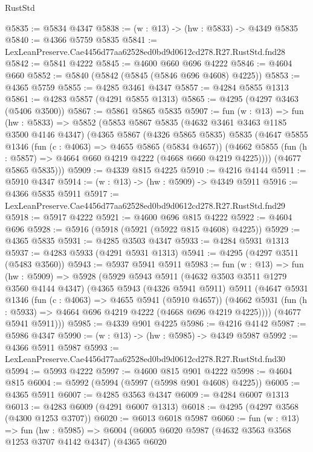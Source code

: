 \begin{lexlean}{RustStd}
\begin{coremodule}
@5835 := @5834 @4347
@5838 := (w : @13) -> (hw : @5833) -> @4349 @5835
@5840 := @4366 @5759 @5835
@5841 := LexLeanPreserve.Cae4456d77aa62528ed0bd9d0612cd278.R27.RustStd.fnd28
@5842 := @5841 @4222
@5845 := @4600 @660 @696 @4222
@5846 := @4604 @660
@5852 := @5840 (@5842 (@5845 (@5846 @696 @4608) @4225))
@5853 := @4365 @5759
@5855 := @4285 @3461 @4347
@5857 := @4284 @5855 @1313
@5861 := @4283 @5857 (@4291 @5855 @1313)
@5865 := @4295 (@4297 @3463 (@5406 @3500))
@5867 := @5861 @5865 @5835
@5907 := fun (w : @13) =>
  fun (hw : @5833) =>
  @5852
    (@5853
      @5867
      @5835
      (@4632 @3461 @3463 @1185 @3500 @4146 @4347)
      (@4365
        @5867
        (@4326 @5865 @5835)
        @5835
        (@4647
          @5855
          @1346
          (fun (c : @4063) => @4655 @5865 (@5834 @4657))
          (@4662 @5855 (fun (h : @5857) => @4664 @660 @4219 @4222 (@4668 @660 @4219 @4225))))
        (@4677 @5865 @5835)))
@5909 := @4339 @815 @4225
@5910 := @4216 @4144
@5911 := @5910 @4347
@5914 := (w : @13) -> (hw : @5909) -> @4349 @5911
@5916 := @4366 @5835 @5911
@5917 := LexLeanPreserve.Cae4456d77aa62528ed0bd9d0612cd278.R27.RustStd.fnd29
@5918 := @5917 @4222
@5921 := @4600 @696 @815 @4222
@5922 := @4604 @696
@5928 := @5916 (@5918 (@5921 (@5922 @815 @4608) @4225))
@5929 := @4365 @5835
@5931 := @4285 @3503 @4347
@5933 := @4284 @5931 @1313
@5937 := @4283 @5933 (@4291 @5931 @1313)
@5941 := @4295 (@4297 @3511 (@5483 @3560))
@5943 := @5937 @5941 @5911
@5983 := fun (w : @13) =>
  fun (hw : @5909) =>
  @5928
    (@5929
      @5943
      @5911
      (@4632 @3503 @3511 @1279 @3560 @4144 @4347)
      (@4365
        @5943
        (@4326 @5941 @5911)
        @5911
        (@4647
          @5931
          @1346
          (fun (c : @4063) => @4655 @5941 (@5910 @4657))
          (@4662 @5931 (fun (h : @5933) => @4664 @696 @4219 @4222 (@4668 @696 @4219 @4225))))
        (@4677 @5941 @5911)))
@5985 := @4339 @901 @4225
@5986 := @4216 @4142
@5987 := @5986 @4347
@5990 := (w : @13) -> (hw : @5985) -> @4349 @5987
@5992 := @4366 @5911 @5987
@5993 := LexLeanPreserve.Cae4456d77aa62528ed0bd9d0612cd278.R27.RustStd.fnd30
@5994 := @5993 @4222
@5997 := @4600 @815 @901 @4222
@5998 := @4604 @815
@6004 := @5992 (@5994 (@5997 (@5998 @901 @4608) @4225))
@6005 := @4365 @5911
@6007 := @4285 @3563 @4347
@6009 := @4284 @6007 @1313
@6013 := @4283 @6009 (@4291 @6007 @1313)
@6018 := @4295 (@4297 @3568 (@4300 @1253 @3707))
@6020 := @6013 @6018 @5987
@6060 := fun (w : @13) =>
  fun (hw : @5985) =>
  @6004
    (@6005
      @6020
      @5987
      (@4632 @3563 @3568 @1253 @3707 @4142 @4347)
      (@4365
        @6020

\end{coremodule}
\end{lexlean}
